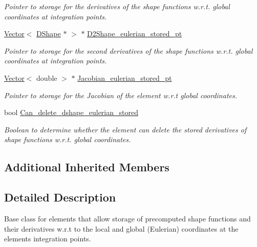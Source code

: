 \begin{DoxyCompactItemize}
\begin{DoxyCompactList}\small\item\em Pointer to storage for the derivatives of the shape functions w.\+r.\+t. global coordinates at integration points. \end{DoxyCompactList}\item 
\hyperlink{classoomph_1_1Vector}{Vector}$<$ \hyperlink{classoomph_1_1DShape}{D\+Shape} $\ast$ $>$ $\ast$ \hyperlink{classoomph_1_1StorableShapeElementBase_a46f6e7962305b650b731de246ea35045}{D2\+Shape\+\_\+eulerian\+\_\+stored\+\_\+pt}
\begin{DoxyCompactList}\small\item\em Pointer to storage for the second derivatives of the shape functions w.\+r.\+t. global coordinates at integration points. \end{DoxyCompactList}\item 
\hyperlink{classoomph_1_1Vector}{Vector}$<$ double $>$ $\ast$ \hyperlink{classoomph_1_1StorableShapeElementBase_a8538f345668e6a3dca096c2168dab1c7}{Jacobian\+\_\+eulerian\+\_\+stored\+\_\+pt}
\begin{DoxyCompactList}\small\item\em Pointer to storage for the Jacobian of the element w.\+r.\+t global coordinates. \end{DoxyCompactList}\item 
bool \hyperlink{classoomph_1_1StorableShapeElementBase_ac5a27ce82786d5e0b8399c94250c787e}{Can\+\_\+delete\+\_\+dshape\+\_\+eulerian\+\_\+stored}
\begin{DoxyCompactList}\small\item\em Boolean to determine whether the element can delete the stored derivatives of shape functions w.\+r.\+t. global coordinates. \end{DoxyCompactList}\end{DoxyCompactItemize}
\subsection*{Additional Inherited Members}


\subsection{Detailed Description}
Base class for elements that allow storage of precomputed shape functions and their derivatives w.\+r.\+t to the local and global (Eulerian) coordinates at the element\textquotesingle{}s integration points. 

